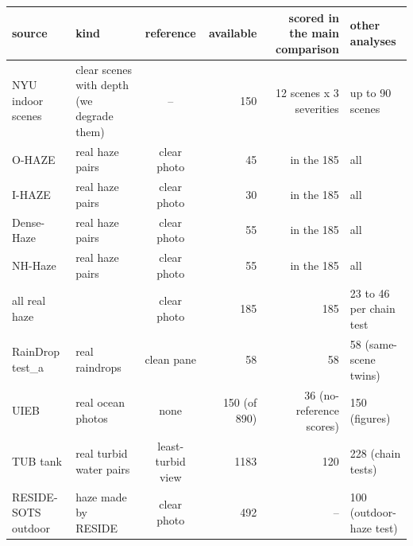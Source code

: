 \begin{tabular}{llcrrl}
\toprule
source & kind & reference & available & scored in the main comparison & other analyses \\
\midrule
NYU indoor scenes & clear scenes with depth (we degrade them) & -- & 150 & 12 scenes x 3 severities & up to 90 scenes \\
O-HAZE & real haze pairs & clear photo & 45 & in the 185 & all \\
I-HAZE & real haze pairs & clear photo & 30 & in the 185 & all \\
Dense-Haze & real haze pairs & clear photo & 55 & in the 185 & all \\
NH-Haze & real haze pairs & clear photo & 55 & in the 185 & all \\
all real haze &  & clear photo & 185 & 185 & 23 to 46 per chain test \\
RainDrop test\_a & real raindrops & clean pane & 58 & 58 & 58 (same-scene twins) \\
UIEB & real ocean photos & none & 150 (of 890) & 36 (no-reference scores) & 150 (figures) \\
TUB tank & real turbid water pairs & least-turbid view & 1183 & 120 & 228 (chain tests) \\
RESIDE-SOTS outdoor & haze made by RESIDE & clear photo & 492 & -- & 100 (outdoor-haze test) \\
\bottomrule
\end{tabular}
